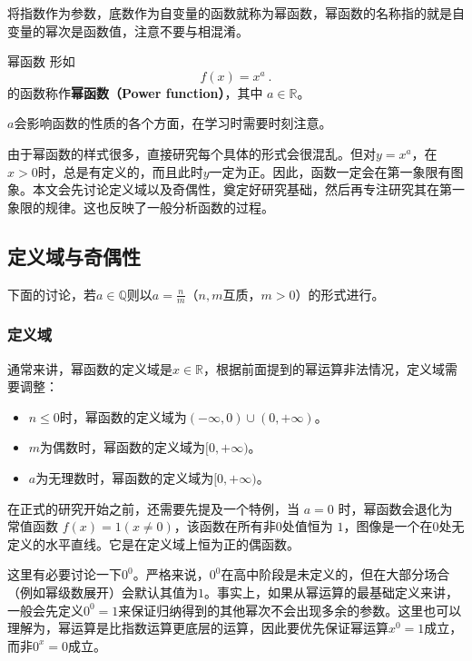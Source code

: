 将指数作为参数，底数作为自变量的函数就称为幂函数，幂函数的名称指的就是自变量的幂次是函数值，注意不要与相混淆。

\begin{definition}{幂函数}
形如
\begin{equation}
f(x) = x^a~.
\end{equation}
的函数称作\textbf{幂函数（Power function）}，其中 $a\in\mathbb R$。
\end{definition}

$a$会影响函数的性质的各个方面，在学习时需要时刻注意。

由于幂函数的样式很多，直接研究每个具体的形式会很混乱。但对$y=x^a$，在$x>0$时，总是有定义的，而且此时$y$一定为正。因此，函数一定会在第一象限有图象。本文会先讨论定义域以及奇偶性，奠定好研究基础，然后再专注研究其在第一象限的规律。这也反映了一般分析函数的过程。

\subsection{定义域与奇偶性}

下面的讨论，若$a\in\mathbb{Q}$则以$\displaystyle a=\frac{n}{m}$（$n,m$互质，$m>0$）的形式进行。

\subsubsection{定义域}

通常来讲，幂函数的定义域是$x\in\mathbb{R}$，根据前面提到的幂运算非法情况，定义域需要调整：

\begin{itemize}
\item $n\leq0$时，幂函数的定义域为$({-\infty},0)\cup(0,{+\infty})$。
\item ${m}$为偶数时，幂函数的定义域为$[0,{+\infty})$。
\item $a$为无理数时，幂函数的定义域为$[0,{+\infty})$。
\end{itemize}

在正式的研究开始之前，还需要先提及一个特例，当 $a = 0$ 时，幂函数会退化为常值函数 $f(x) = 1(x\neq0)$，该函数在所有非$0$处值恒为 $1$，图像是一个在$0$处无定义的水平直线。它是在定义域上恒为正的偶函数。

这里有必要讨论一下$0^0$。严格来说，$0^0$在高中阶段是未定义的，但在大部分场合（例如幂级数展开）会默认其值为$1$。事实上，如果从幂运算的最基础定义来讲，一般会先定义$0^0=1$来保证归纳得到的其他幂次不会出现多余的参数。这里也可以理解为，幂运算是比指数运算更底层的运算，因此要优先保证幂运算$x^0=1$成立，而非$0^x=0$成立。

